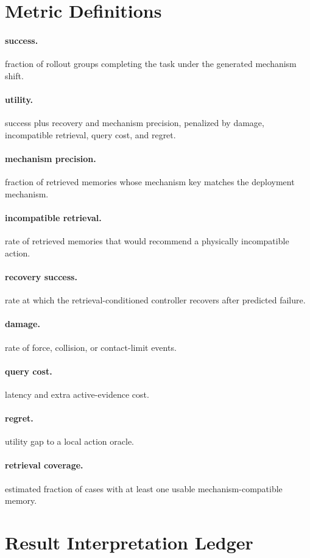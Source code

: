\documentclass{article}
\begin{document}
\section{Metric Definitions}
\paragraph{success.} fraction of rollout groups completing the task under the generated mechanism shift.
\paragraph{utility.} success plus recovery and mechanism precision, penalized by damage, incompatible retrieval, query cost, and regret.
\paragraph{mechanism precision.} fraction of retrieved memories whose mechanism key matches the deployment mechanism.
\paragraph{incompatible retrieval.} rate of retrieved memories that would recommend a physically incompatible action.
\paragraph{recovery success.} rate at which the retrieval-conditioned controller recovers after predicted failure.
\paragraph{damage.} rate of force, collision, or contact-limit events.
\paragraph{query cost.} latency and extra active-evidence cost.
\paragraph{regret.} utility gap to a local action oracle.
\paragraph{retrieval coverage.} estimated fraction of cases with at least one usable mechanism-compatible memory.
\section{Result Interpretation Ledger}
\end{document}
